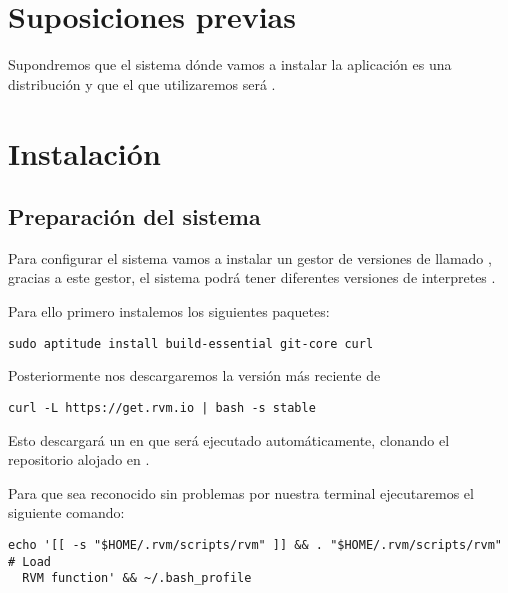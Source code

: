 

\section{Suposiciones previas}
Supondremos que el sistema dónde vamos a instalar la aplicación es una
distribución  y que el  que utilizaremos
será .

\section{Instalación}
\subsection{Preparación del sistema}
Para configurar el sistema vamos a instalar un gestor de versiones de
 llamado  \cite{prog:rvm}, gracias a este gestor, el
sistema podrá tener diferentes versiones de interpretes .

Para ello primero instalemos los siguientes paquetes:

\begin{lstlisting}[style=consola]
  sudo aptitude install build-essential git-core curl
\end{lstlisting}

Posteriormente nos descargaremos la versión más reciente de 

\begin{lstlisting}[style=consola]
  curl -L https://get.rvm.io | bash -s stable
\end{lstlisting}

Esto descargará un  en  que será ejecutado
automáticamente, clonando el repositorio alojado en .

Para que  sea reconocido sin problemas por nuestra terminal
ejecutaremos el siguiente comando:

\begin{lstlisting}[style=consola]
  echo '[[ -s "$HOME/.rvm/scripts/rvm" ]] && . "$HOME/.rvm/scripts/rvm" # Load
  RVM function' && ~/.bash_profile
\end{lstlisting}

